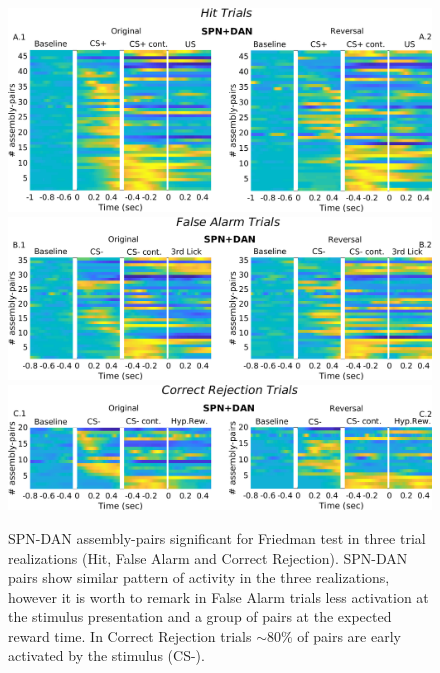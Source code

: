 \begin{figure}
\centering
\includegraphics[scale=0.36]{figures/HeatSPN_DANHit.png}
\includegraphics[scale=0.36]{figures/HeatFA_SPN_DAN1.png}
\includegraphics[scale=0.36]{figures/HeatCR_SPN_DAN1.png}
\caption{SPN-DAN assembly-pairs significant for Friedman test in three trial realizations (Hit, False Alarm and Correct Rejection). SPN-DAN pairs show similar pattern of activity in the three realizations, however it is worth to remark in False Alarm trials less activation at the stimulus presentation and a group of pairs at the expected reward time. In Correct Rejection trials $\sim 80\%$ of pairs are early activated by the stimulus (CS-).}
\label{fig:HeatSPN_DANComp}
\end{figure}
